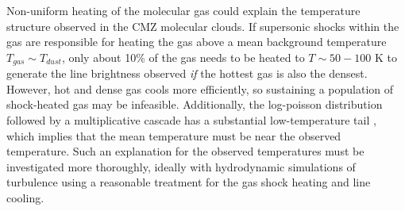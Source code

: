 Non-uniform heating of the molecular gas could explain the temperature
structure observed in the CMZ molecular clouds.  If supersonic shocks within
the gas are responsible for heating the gas above a mean background temperature
$T_{gas} \sim T_{dust}$, only about 10\% of the gas needs to be heated to
$T\sim50-100$ K to generate the line brightness observed \emph{if} the hottest
gas is also the densest.  However, hot and dense gas cools more efficiently, so
sustaining a population of shock-heated gas may be infeasible.  Additionally,
the log-poisson distribution followed by a multiplicative cascade has a
substantial low-temperature tail \citep{Pan2009a}, which implies that the mean
temperature must be near the observed temperature.  Such an explanation for the
observed temperatures must be investigated more thoroughly, ideally with
hydrodynamic simulations of turbulence using a reasonable treatment for the gas
shock heating and line cooling.



%

